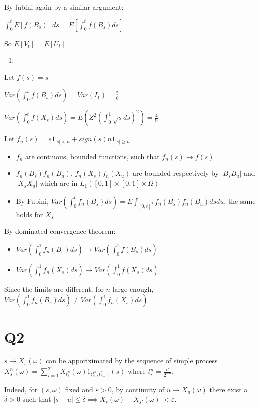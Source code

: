 \documentclass[11pt]{article}
\begin{document}
By fubini again by a similar argument:

\(\int_0^t E[f(B_s)] ds = E[\int_0^t f(B_s) ds]\)

So \(E[V_t] = E[U_t]\)

\begin{enumerate}
\item 
\end{enumerate}
Let \(f(s) = s\)

\(Var(\int_0^t f(B_s) ds) =  Var(I_1) = \frac56\)

\(Var(\int_0^t f(X_s) ds) = E(Z^2 (\int_0^1\sqrt{s}ds)^2) = \frac{4}{9}\)

Let \(f_n(s) = s1_{|s| < n} + sign(s) n 1_{|s| \ge n}\)

\begin{itemize}
\item \(f_n\) are contiuous, bounded functions, such that \(f_n(s) \rightarrow f(s)\)
\item \(f_n(B_s)f_n(B_u)\), \(f_n(X_s)f_n(X_u)\) are bounded respectively by \(|B_sB_u|\) and \(|X_sX_u|\) which are in \(L_1([0, 1] \times [0, 1] \times \Omega)\)
\item By Fubini, \(Var(\int_0^t f_n(B_s) ds) = E  \int_{[0, t]^2} f_n(B_s)f_n(B_u) ds du\), the same holds for \(X_s\)
\end{itemize}

By dominated convergence theorem:
\begin{itemize}
\item \(Var(\int_0^1 f_n(B_s) ds) \rightarrow Var(\int_0^1 f(B_s) ds)\)
\item \(Var(\int_0^1 f_n(X_s) ds) \rightarrow Var(\int_0^1 f(X_s) ds)\)
\end{itemize}

Since the limits are different, for \(n\) large enough, \(Var(\int_0^1 f_n(B_s) ds) \ne Var(\int_0^1 f_n(X_s) ds)\).

\section*{Q2}
\label{sec:orgheadline5}

\(s \rightarrow X_s(\omega)\) can be apporiximated  by the sequence of simple process \(X^n_s(\omega) = \sum_{i=1}^{2^n} X_{t^n_i}(\omega) 1_{(t^n_i, t^n_{i+1}]}(s)\) where \(t_i^n = \frac{it}{2^{-n}}\).

Indeed, for \((s, \omega)\) fixed and \(\varepsilon > 0\), by continuity of \(u \rightarrow X_u(\omega)\)
there exist a \(\delta > 0\) such that \(|s - u|  \le \delta \implies X_s(\omega) - X_{s'}(\omega)| < \varepsilon\).
\end{document}
